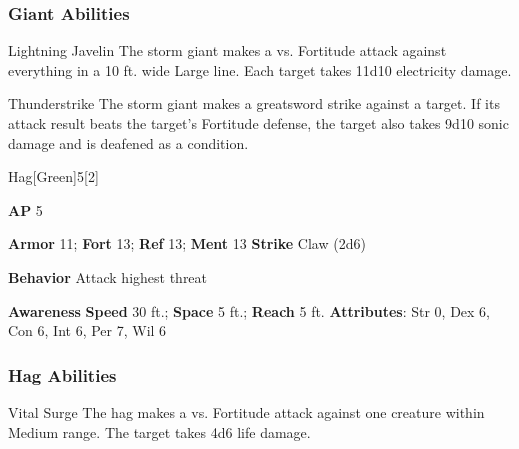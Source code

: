 \subsubsection{Giant Abilities}

\begin{freeability}{Lightning Javelin}
The storm giant makes a  vs. Fortitude attack against everything in a 10 ft. wide Large line.
\hit Each target takes 11d10 electricity damage.
\end{freeability}

\vspace{0.5em}
\begin{freeability}{Thunderstrike}
The storm giant makes a greatsword strike against a target.
If its attack result beats the target's Fortitude defense,
the target also takes 9d10 sonic damage
and is deafened as a condition.
\end{freeability}

\begin{monsection}{Hag}[Green]{5}[2]
\vspace{-1em}\vspace{-1em}
\begin{spellcontent}
\begin{spelltargetinginfo}
{\textbf{AP} 5}

\pari \textbf{Armor} 11;
\textbf{Fort} 13;
\textbf{Ref} 13;
\textbf{Ment} 13
\pari \textbf{Strike} Claw  (2d6)



\pari \textbf{Behavior} Attack highest threat
\end{spelltargetinginfo}
\end{spellcontent}

\begin{monsterfooter}
\pari \textbf{Awareness} 
\pari \textbf{Speed} 30 ft.;
\textbf{Space} 5 ft.;
\textbf{Reach} 5 ft.
\pari \textbf{Attributes}:
Str 0,
Dex 6,
Con 6,
Int 6,
Per 7,
Wil 6
\end{monsterfooter}
\end{monsection}


\subsubsection{Hag Abilities}

\begin{freeability}{Vital Surge}
The hag makes a  vs. Fortitude attack against one creature within Medium range.
\hit The target takes 4d6 life damage.
\end{freeability}

